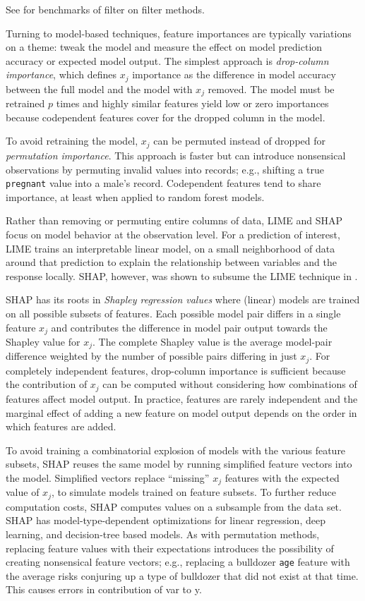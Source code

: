 \documentclass[twoside,11pt]{article}
\begin{document}
See \cite{filter-benchmark} for benchmarks of filter on filter methods.

Turning to model-based techniques, feature importances are typically variations on a theme: tweak the model and measure the effect on model prediction accuracy or expected model output. The simplest approach is {\em drop-column importance}, which defines $x_j$ importance as the difference in model accuracy between the full model and the model with $x_j$ removed. The model must be retrained $p$ times and highly similar features yield low or zero importances because codependent features cover for the dropped column in the model.

To avoid retraining the model, $x_j$ can be permuted instead of dropped for {\em permutation importance}. This approach is faster but can introduce nonsensical observations by permuting invalid values into records; e.g., shifting a true {\tt\small pregnant} value into a male's record. Codependent features tend to share importance, at least when applied to random forest models.

Rather than removing or permuting entire columns of data, LIME \cite{lime} and SHAP \cite{shap} focus on model behavior at the observation level. For a prediction of interest, LIME trains an interpretable linear model, on a small neighborhood of data around that prediction to explain the relationship between variables and the response locally. SHAP, however, was shown to subsume the LIME technique in \cite{shap}.

SHAP has its roots in {\em Shapley regression values} \cite{shapley-regression} where (linear) models are trained on all possible subsets of features.  Each possible model pair differs in a single feature $x_j$ and contributes the difference in model pair output towards the Shapley value for $x_j$. The complete Shapley value is the average model-pair difference weighted by the number of possible pairs differing in just $x_j$.  For completely independent features, drop-column importance is sufficient because the contribution of $x_j$ can be computed without considering how combinations of features affect model output.  In practice, features are rarely independent and the marginal effect of adding a new feature on model output depends on the order in which features are added.  

To avoid training a combinatorial explosion of models with the various feature subsets, SHAP reuses the same model by running simplified feature vectors into the model. Simplified vectors replace ``missing'' $x_j$ features with the expected value of $x_j$, to simulate models trained on feature subsets. To further reduce computation costs, SHAP computes values on a subsample from the data set. SHAP has model-type-dependent optimizations for linear regression, deep learning, and decision-tree based models. As with permutation methods, replacing feature values with their expectations introduces the possibility of creating nonsensical feature vectors; e.g., replacing a bulldozer {\tt\small age} feature with the average risks conjuring up a type of bulldozer that did not exist at that time. This causes errors in contribution of var to y. 
\end{document}

